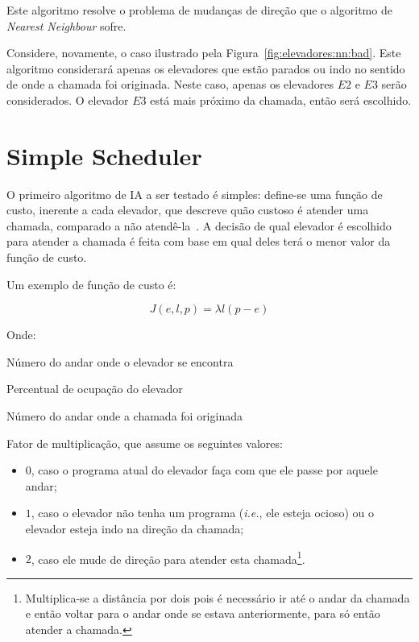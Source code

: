 Este algoritmo resolve o problema de mudanças de direção que o algoritmo de
\textit{Nearest Neighbour} sofre.

Considere, novamente, o caso ilustrado pela Figura~\ref{fig:elevadores:nn:bad}.
Este algoritmo considerará apenas os elevadores que estão parados ou indo no
sentido de onde a chamada foi originada. Neste caso, apenas os elevadores $E2$ e
$E3$ serão considerados. O elevador $E3$ está mais próximo da chamada, então
será escolhido.

\section{\label{sec:ai:minimize-cost-function}Simple Scheduler}

O primeiro algoritmo de IA a ser testado é simples: define-se uma
função de custo, inerente a cada elevador, que descreve quão custoso
é atender uma chamada, comparado a não atendê-la~\cite{Friese20061908}.
A decisão de qual elevador é escolhido para atender a chamada é feita com base
em qual deles terá o menor valor da função de custo.

Um exemplo de função de custo é:

\[
  J(e, l, p) = \lambda l(p - e)
\]

Onde:
\begin{description}[leftmargin=!,labelwidth=\widthof{\bfseries Pu}]
\item[$\boldsymbol{e}$] Número do andar onde o elevador se encontra
\item[$\boldsymbol{l}$] Percentual de ocupação do elevador
\item[$\boldsymbol{p}$] Número do andar onde a chamada foi originada
\item[$\boldsymbol{\lambda}$] Fator de multiplicação, que assume os seguintes valores:
  \begin{itemize}
    \item $0$, caso o programa atual do elevador faça com que ele passe por
      aquele andar;
    \item $1$, caso o elevador não tenha um programa (\textit{i.e.},
      ele esteja ocioso) ou o elevador esteja indo na direção da chamada;
    \item $2$, caso ele mude de direção para atender esta chamada\footnote{Multiplica-se
        a distância por dois pois é necessário ir até o andar da chamada e então
        voltar para o andar onde se estava anteriormente, para só então atender
        a chamada.}.
  \end{itemize}
\end{description}

